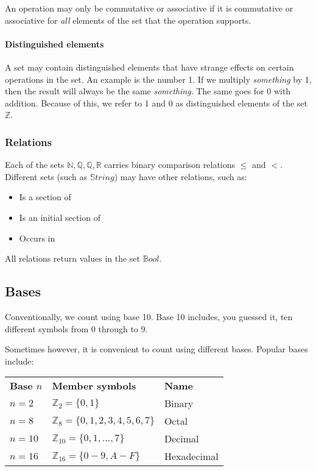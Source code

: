 An operation may only be commutative or associative if it is commutative or
associative for {\it all} elements of the set that the operation supports.

\paragraph{Distinguished elements}

A set may contain distinguished elements that have strange effects on certain
operations in the set. An example is the number 1. If we multiply {\it
something} by 1, then the result will always be the same {\it something}. The
same goes for 0 with addition. Because of this, we refer to 1 and 0 as
distinguished elements of the set $\mathbb{Z}$.

\subsubsection{Relations}

Each of the sets $\mathbb{N, Q, Q, R}$ carries binary comparison relations
$\leq$ and $<$. Different sets (such as $\mathbb{S}tring$) may have other
relations, such as:

\begin{itemize}
	\item Is a section of
	\item Is an initial section of
	\item Occurs in
\end{itemize}

All relations return values in the set $\mathbb{B}ool$.

\subsection{Bases}

Conventionally, we count using base 10. Base 10 includes, you guessed it, ten
different symbols from 0 through to 9.

Sometimes however, it is convenient to count using different bases. Popular
bases include:

\begin{center}
	\begin{tabular}{l l l}
		{\bf Base $n$} & {\bf Member symbols} & {\bf Name}\\
		$n = 2$ & $\mathbb{Z}_2 = \{0, 1\}$ & Binary\\
		$n = 8$ & $\mathbb{Z}_8 = \{0, 1, 2, 3, 4, 5, 6, 7\}$ & Octal\\
		$n = 10$ & $\mathbb{Z}_{10} = \{0, 1, \ldots, 7\}$ & Decimal\\
		$n = 16$ & $\mathbb{Z}_{16} = \{0-9, A-F\}$ & Hexadecimal\\
	\end{tabular}
\end{center}

